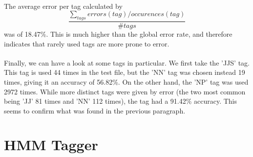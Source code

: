 \documentclass[10pt, a4paper, oneside]{article} %
\begin{document}
\paragraph*{} The average error per tag calculated by
$$ \frac{\sum_{tags}errors(tag)/occurences(tag)}{\# tags}$$
was of 18.47\%. This is much higher than the global error rate, and therefore indicates that rarely used tags are more prone to error.

\paragraph*{}Finally, we can have a look at some tags in particular. We first take the 'JJS' tag. This tag is used 44 times in the test file, but the 'NN' tag was chosen instead 19 times, giving it an accuracy of 56.82\%. On the other hand, the 'NP' tag was used 2972 times. While more distinct tags were given by error (the two most common being 'JJ' 81 times and 'NN' 112 times), the tag had a 91.42\% accuracy. This seems to confirm what was found in the previous paragraph.

\section{HMM Tagger}


\pagestyle{fancy} %

\pagebreak
%
%
%
%
%
%
%
%
%
%
%
%
%
%




%
%
%
\end{document}
